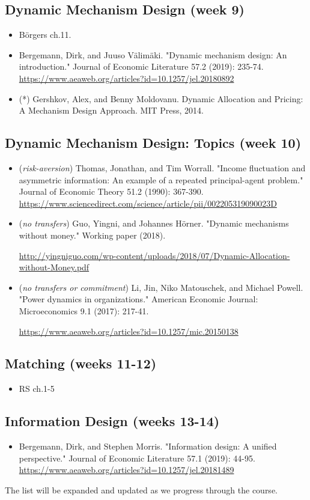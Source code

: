 \documentclass{article}
\begin{document}
\subsection{Dynamic Mechanism Design (week 9)}
\begin{itemize}
	\item B{\"o}rgers ch.11.
	\item Bergemann, Dirk, and Juuso Välimäki. "Dynamic mechanism design: An introduction." Journal of Economic Literature 57.2 (2019): 235-74. \url{https://www.aeaweb.org/articles?id=10.1257/jel.20180892}
	\item (*) Gershkov, Alex, and Benny Moldovanu. Dynamic Allocation and Pricing: A Mechanism Design Approach. MIT Press, 2014. 
\end{itemize}

\subsection{Dynamic Mechanism Design: Topics (week 10)}
\begin{itemize}
	\item (\emph{risk-aversion}) Thomas, Jonathan, and Tim Worrall. "Income fluctuation and asymmetric information: An example of a repeated principal-agent problem." Journal of Economic Theory 51.2 (1990): 367-390. \url{https://www.sciencedirect.com/science/article/pii/002205319090023D}
	\item (\emph{no transfers}) Guo, Yingni, and Johannes Hörner. "Dynamic mechanisms without money." Working paper (2018). 
	
	\url{http://yingniguo.com/wp-content/uploads/2018/07/Dynamic-Allocation-without-Money.pdf}
	\item (\emph{no transfers or commitment}) Li, Jin, Niko Matouschek, and Michael Powell. "Power dynamics in organizations." American Economic Journal: Microeconomics 9.1 (2017): 217-41.
	
	\url{https://www.aeaweb.org/articles?id=10.1257/mic.20150138}
\end{itemize}

\subsection{Matching (weeks 11-12)}
\begin{itemize}
	\item RS ch.1-5
\end{itemize}

\subsection{Information Design (weeks 13-14)}
\begin{itemize}
	\item Bergemann, Dirk, and Stephen Morris. "Information design: A unified perspective." Journal of Economic Literature 57.1 (2019): 44-95. \url{https://www.aeaweb.org/articles?id=10.1257/jel.20181489}
\end{itemize}

\bigskip
The list will be expanded and updated as we progress through the course.


\end{document}
